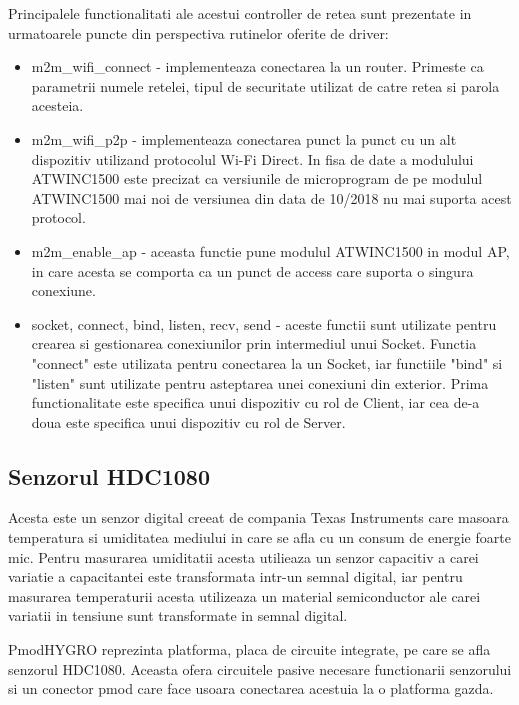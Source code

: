 Principalele functionalitati ale acestui controller de retea sunt prezentate in urmatoarele puncte din perspectiva rutinelor oferite de driver:
\begin{itemize}
	\item m2m\_wifi\_connect - implementeaza conectarea la un router. Primeste ca parametrii numele retelei, tipul de securitate utilizat de catre retea si parola acesteia.
	\item m2m\_wifi\_p2p - implementeaza conectarea punct la punct cu un alt dispozitiv utilizand protocolul Wi-Fi Direct. In fisa de date a modulului ATWINC1500 
    \cite{atwinc1500} este precizat ca versiunile de microprogram de pe modulul ATWINC1500 mai noi de versiunea din data de 10/2018 nu mai suporta acest protocol.
    \item m2m\_enable\_ap - aceasta functie pune modulul ATWINC1500 in modul AP, in care acesta se comporta ca un punct de access care suporta o singura conexiune.
    \item socket, connect, bind, listen, recv, send - aceste functii sunt utilizate pentru crearea si gestionarea conexiunilor prin intermediul unui Socket. 
    Functia "connect" este utilizata pentru conectarea la un Socket, iar functiile "bind" si "listen" sunt utilizate pentru asteptarea unei conexiuni din exterior. Prima 
    functionalitate este specifica unui dispozitiv cu rol de Client, iar cea de-a doua este specifica unui dispozitiv cu rol de Server.
\end{itemize}

\subsection{Senzorul HDC1080}\label{subsec:af_hdc1080}
Acesta este un senzor digital creeat de compania Texas Instruments care masoara temperatura si umiditatea mediului in care se afla cu un consum de energie foarte mic. 
Pentru masurarea umiditatii acesta utilieaza un senzor capacitiv a carei variatie a capacitantei este transformata intr-un semnal digital, iar pentru masurarea 
temperaturii acesta utilizeaza un material semiconductor ale carei variatii in tensiune sunt transformate in semnal digital.

PmodHYGRO reprezinta platforma, placa de circuite integrate, pe care se afla senzorul HDC1080. Aceasta ofera circuitele pasive necesare functionarii senzorului si 
un conector pmod care face usoara conectarea acestuia la o platforma gazda.

